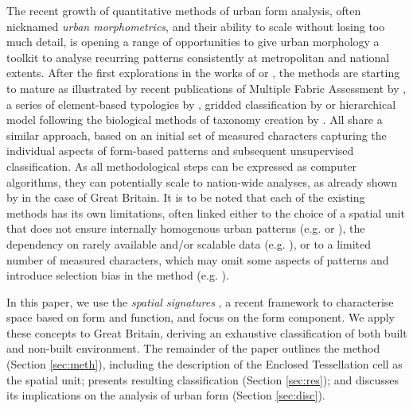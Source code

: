 The recent growth of quantitative methods of urban form analysis, often nicknamed
\textit{urban morphometrics}, and their ability to scale without losing too
much detail,
is opening a range of opportunities to give urban morphology a toolkit to analyse
recurring patterns consistently at metropolitan and national extents. After the first explorations in
the works of \cite{gil2012} or \cite{hamaina2012a}, the methods are starting to mature
as illustrated by recent publications of Multiple Fabric Assessment by
\cite{araldi2019}, a series of element-based typologies by \cite{berghauserpont2019a},
gridded classification by \cite{jochem2020} or hierarchical model following the
biological methods of taxonomy creation by \cite{fleischmann2021a}. All share a similar
approach, based on an initial set of measured characters capturing the individual
aspects of form-based patterns and subsequent unsupervised classification. As all
methodological steps can be expressed as computer algorithms, they can potentially scale
to nation-wide analyses, as already shown by \cite{jochem2020} in the case of Great
Britain.
It is to be noted that each of the existing methods has its own
limitations, often linked either to the choice of a spatial unit that does not ensure internally
homogenous urban patterns (e.g. \citealp{jochem2020} or \citealp{araldi2019}), the dependency on rarely
available and/or scalable data (e.g. \citealp{berghauserpont2019a}), or to a limited number of measured characters,
which may omit some aspects of patterns and introduce selection bias in the method
(e.g. \citealp{berghauserpont2019a}).

In this paper, we use the \textit{spatial signatures}
\citep{dab_mf_2021}, a recent framework to characterise space based on form
and function, and focus on the form component.
%
We apply these concepts to Great Britain, deriving an
exhaustive classification of both built and non-built environment. The remainder of the
paper outlines the method (Section \ref{sec:meth}), including the description of the
Enclosed Tessellation cell as the spatial unit; presents resulting classification (Section
\ref{sec:res}); and discusses its implications on the analysis of urban form (Section
\ref{sec:disc}).
